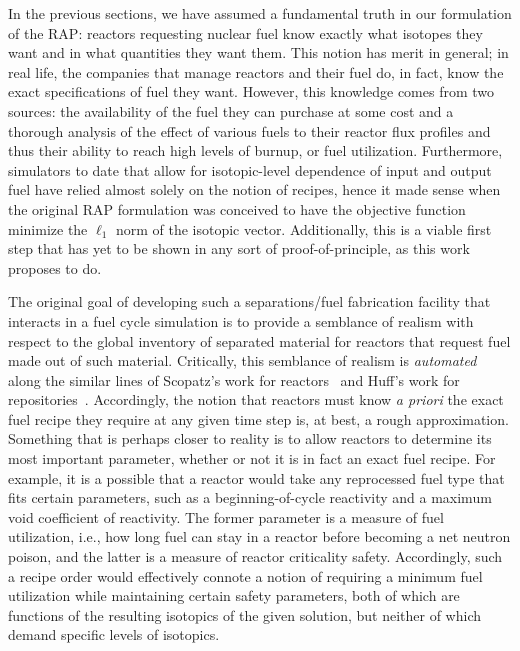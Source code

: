 In the previous sections, we have assumed a fundamental truth in our formulation
of the RAP: reactors requesting nuclear fuel know exactly what isotopes they
want and in what quantities they want them. This notion has merit in general; in
real life, the companies that manage reactors and their fuel do, in fact, know
the exact specifications of fuel they want. However, this knowledge comes from
two sources: the availability of the fuel they can purchase at some cost and a
thorough analysis of the effect of various fuels to their reactor flux profiles
and thus their ability to reach high levels of burnup, or fuel
utilization. Furthermore, simulators to date that allow for isotopic-level
dependence of input and output fuel have relied almost solely on the notion of
recipes, hence it made sense when the original RAP formulation was conceived to
have the objective function minimize the $\ell_1$ norm of the isotopic
vector. Additionally, this is a viable first step that has yet to be shown in
any sort of proof-of-principle, as this work proposes to do.

The original goal of developing such a separations/fuel fabrication facility
that interacts in a fuel cycle simulation is to provide a semblance of realism
with respect to the global inventory of separated material for reactors that
request fuel made out of such material. Critically, this semblance of realism is
\textit{automated} along the similar lines of Scopatz's work for
reactors~\cite{scopatz_essential_2011} and Huff's work for
repositories~\cite{huff_integrated_2013}. Accordingly, the notion that reactors
must know \textit{a priori} the exact fuel recipe they require at any given time
step is, at best, a rough approximation. Something that is perhaps closer to
reality is to allow reactors to determine its most important parameter, whether
or not it is in fact an exact fuel recipe. For example, it is a possible that a
reactor would take any reprocessed fuel type that fits certain parameters, such
as a beginning-of-cycle reactivity and a maximum void coefficient of
reactivity. The former parameter is a measure of fuel utilization, i.e., how
long fuel can stay in a reactor before becoming a net neutron poison, and the
latter is a measure of reactor criticality safety. Accordingly, such a recipe
order would effectively connote a notion of requiring a minimum fuel utilization
while maintaining certain safety parameters, both of which are functions of the
resulting isotopics of the given solution, but neither of which demand specific
levels of isotopics.

